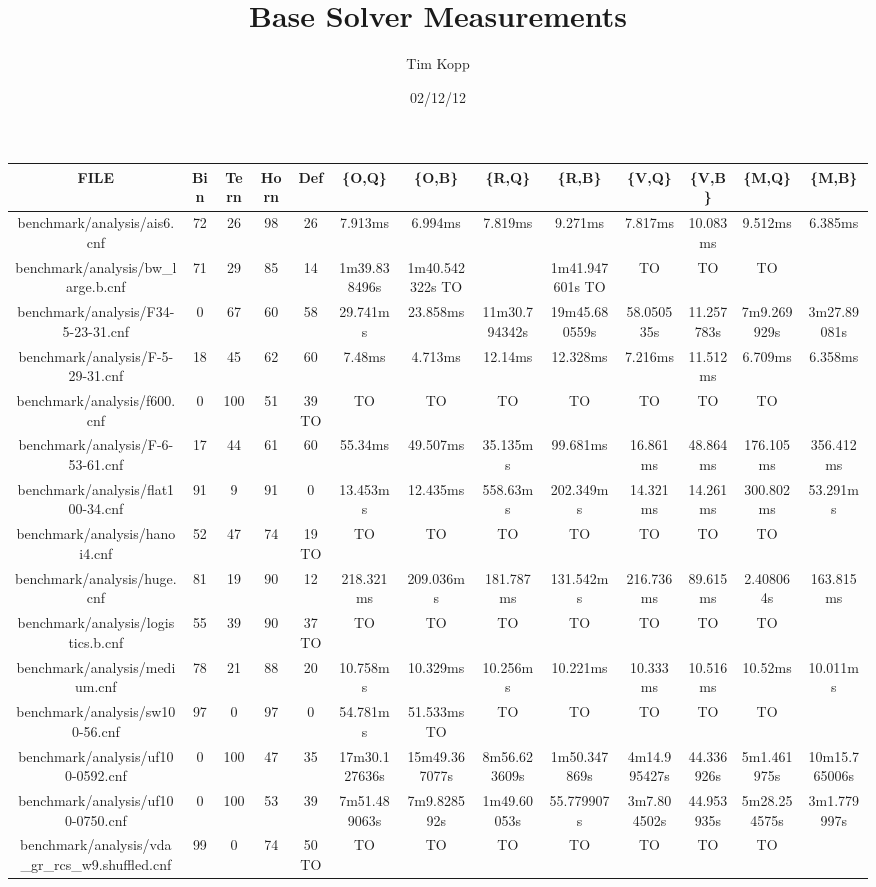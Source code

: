 \documentclass{article}
\title{Base Solver Measurements}
\author{Tim Kopp}
\date{02/12/12}
\begin{document}
\maketitle

\begin{table}[ht!]
\centering
\begin{tabular}{|c||c|c|c|c||c|c|c|c|c|c|c|c|}\hline
FILE & Bin & Tern & Horn & Def & \{O,Q\} & \{O,B\} & \{R,Q\} & \{R,B\} & \{V,Q\} & \{V,B\} & \{M,Q\} & \{M,B\} \\\hline\hline
benchmark/analysis/ais6.cnf & 72 & 26 & 98 & 26 & 7.913ms & 6.994ms & 7.819ms & 9.271ms & 7.817ms & 10.083ms & 9.512ms & 6.385ms \\\hline
benchmark/analysis/bw_large.b.cnf & 71 & 29 & 85 & 14 & 1m39.838496s & 1m40.542322s TO & & 1m41.947601s TO & TO & TO & TO & \\\hline
benchmark/analysis/F34-5-23-31.cnf & 0 & 67 & 60 & 58 & 29.741ms & 23.858ms & 11m30.794342s & 19m45.680559s & 58.050535s & 11.257783s & 7m9.269929s & 3m27.89081s \\\hline
benchmark/analysis/F-5-29-31.cnf & 18 & 45 & 62 & 60 & 7.48ms & 4.713ms & 12.14ms & 12.328ms & 7.216ms & 11.512ms & 6.709ms & 6.358ms \\\hline
benchmark/analysis/f600.cnf & 0 & 100 & 51 & 39 TO & TO & TO & TO & TO & TO & TO & TO & \\\hline
benchmark/analysis/F-6-53-61.cnf & 17 & 44 & 61 & 60 & 55.34ms & 49.507ms & 35.135ms & 99.681ms & 16.861ms & 48.864ms & 176.105ms & 356.412ms \\\hline
benchmark/analysis/flat100-34.cnf & 91 & 9 & 91 & 0 & 13.453ms & 12.435ms & 558.63ms & 202.349ms & 14.321ms & 14.261ms & 300.802ms & 53.291ms \\\hline
benchmark/analysis/hanoi4.cnf & 52 & 47 & 74 & 19 TO & TO & TO & TO & TO & TO & TO & TO & \\\hline
benchmark/analysis/huge.cnf & 81 & 19 & 90 & 12 & 218.321ms & 209.036ms & 181.787ms & 131.542ms & 216.736ms & 89.615ms & 2.408064s & 163.815ms \\\hline
benchmark/analysis/logistics.b.cnf & 55 & 39 & 90 & 37 TO & TO & TO & TO & TO & TO & TO & TO & \\\hline
benchmark/analysis/medium.cnf & 78 & 21 & 88 & 20 & 10.758ms & 10.329ms & 10.256ms & 10.221ms & 10.333ms & 10.516ms & 10.52ms & 10.011ms \\\hline
benchmark/analysis/sw100-56.cnf & 97 & 0 & 97 & 0 & 54.781ms & 51.533ms TO & TO & TO & TO & TO & TO & \\\hline
benchmark/analysis/uf100-0592.cnf & 0 & 100 & 47 & 35 & 17m30.127636s & 15m49.367077s & 8m56.623609s & 1m50.347869s & 4m14.995427s & 44.336926s & 5m1.461975s & 10m15.765006s \\\hline
benchmark/analysis/uf100-0750.cnf & 0 & 100 & 53 & 39 & 7m51.489063s & 7m9.828592s & 1m49.60053s & 55.779907s & 3m7.804502s & 44.953935s & 5m28.254575s & 3m1.779997s \\\hline
benchmark/analysis/vda_gr_rcs_w9.shuffled.cnf & 99 & 0 & 74 & 50 TO & TO & TO & TO & TO & TO & TO & TO & \\\hline
\end{tabular}
\end{table}
\end{document}
